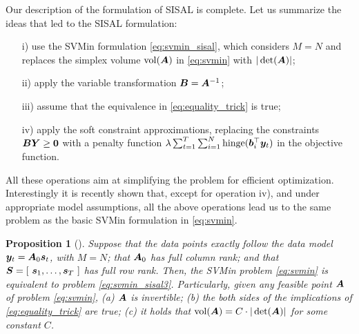 \documentclass[10pt,twocolumn,twoside]{IEEEtran}
\newtheorem{Prop}{Proposition}
\begin{document}
\medskip
\begin{center}
	\noindent {}
\end{center}
\medskip


Our description of the formulation of SISAL is complete.
Let us summarize the ideas that led to the SISAL formulation:
\begin{itemize}
	\item[i)] use the SVMin formulation \eqref{eq:svmin_sisal}, which considers $ M = N $ and replaces the simplex volume $ {\rm vol}({\bm A}) $ in \eqref{eq:svmin} with $ |\det({\bm A}) | $;
	\item[ii)] apply the variable transformation $ {\bm B} = {\bm A}^{-1} $;
	\item[iii)] assume that the equivalence in \eqref{eq:equality_trick} is true;
	\item[iv)] apply the soft constraint approximations, replacing the constraints $ {\bm B}{\bm Y} \geq {\bm 0} $ with a penalty function $ \lambda\sum_{t=1}^T \sum_{i=1}^N {\rm hinge}( {\bm b}_i^\top {\bm y}_t ) $ in the objective function.
\end{itemize}

All these operations aim at simplifying the problem for efficient optimization. Interestingly it is recently shown that, except for operation iv), and under appropriate model assumptions,
all the above operations lead us to the same problem as the basic SVMin formulation in \eqref{eq:svmin}.

\begin{Prop}[{\cite{Ma2021}}] Suppose that the data points exactly follow the  data model ${\bm y}_t = {\bm A}_0 {\bm s}_t$, with $M = N$;
	that ${\bm A}_0$ has full column rank;
	and that ${\bm S} = [~ {\bm s}_1,\ldots,{\bm s}_T ~]$ has full row rank.
	Then, the SVMin problem \eqref{eq:svmin} is equivalent to problem \eqref{eq:svmin_sisal3}.
	Particularly, given any feasible point ${\bm A}$ of problem \eqref{eq:svmin},
	(a) ${\bm A}$ is invertible; (b) the both sides of the implications of \eqref{eq:equality_trick} are true; (c) it holds that ${\rm vol}({\bm A}) = C \cdot |\det({\bm A})|$ for some constant $C$.
\end{Prop}
\end{document}
